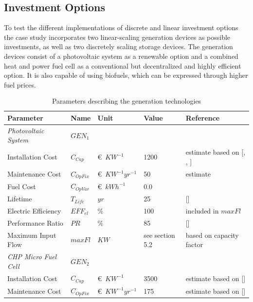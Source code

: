 \documentclass[
	11pt,								%
	DIV10,								%
	a4paper,         					%
	oneside,							%
	headheight=20pt,					%
	footheight=20pt,					%
    parskip=full,						%
    listof=totoc,						%
	bibliography=totoc,					%
	index=totoc,						%
]{scrartcl}
\begin{document}
\subsection{Investment Options}
To test the different implementations of discrete and linear investment options the case study incorporates two linear-scaling generation devices as possible investments, as well as two discretely scaling storage devices. The generation devices consist of a photovoltaic system as a renewable option and a combined heat and power fuel cell as a conventional but decentralized and highly efficient option. It is also capable of using biofuels, which can be expressed through higher fuel prices. 
\begin{table}[H]
	\centering
	\caption{Parameters describing the generation technologies}
	\begin{tabular}{lllll}
		\hline
		\textbf{Parameter}			& \textbf{Name}			& \textbf{Unit}			& \textbf{Value}	&\textbf{Reference}     \\ \hline
		\textit{Photovoltaic System} & $GEN_1$ & & &\\
		Installation Cost           & $C_{Cap}$     		& \euro\ $KW^{-1}$  		& 1200				& estimate based on [\cite{wirthAktuelleFaktenZur2018}, \cite{SolarmoduleEBay2018}, \cite{ModulePriceIndex2018}]  \\
		Maintenance Cost            & $C_{OpFix}$     		& \euro\ $KW^{-1}yr^{-1}$& 50				& estimate \\
		Fuel	 Cost           			& $C_{OpVar}$     		& \euro\ $kWh^{-1}$   	& 0.0			&   \\
		Lifetime                    & $T_{Life}$     		& $yr$  				& 25 				& [\cite{wirthAktuelleFaktenZur2018}]   \\
		Electric Efficiency         & $EFF_{el}$     		& $\%$  				& 100				& included in $maxFl$      \\
		Performance Ratio           & $PR$     		& $\%$  				& 85				& [\cite{wirthAktuelleFaktenZur2018}]   \\
		Maximum Input Flow  			& $maxFl$     		& $KW$ 		 			& see section 5.2				& based on capacity factor   \\
		\hline
		\textit{CHP Micro Fuel Cell} & $GEN_2$ & & &\\
		Installation Cost           & $C_{Cap}$     		& \euro\ $KW^{-1}$  		& 3500 				& estimate based on [\cite{LAUINGER201624}]    \\
		Maintenance Cost            & $C_{OpFix}$     		& \euro\ $KW^{-1}yr^{-1}$& 175				& estimate based on [\cite{LAUINGER201624}]   \\

\end{tabular}
\end{table}
\end{document}
